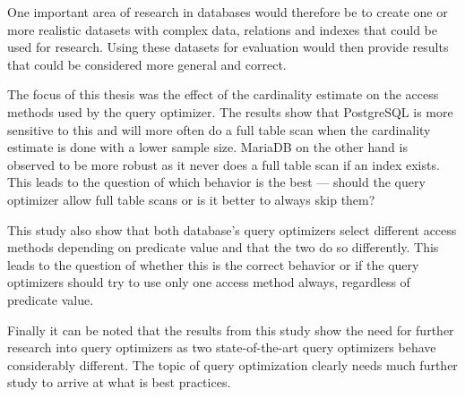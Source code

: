 One important area of research in databases would therefore be to create one or
more realistic datasets with complex data, relations and indexes that could be
used for research. Using these datasets for evaluation would then provide
results that could be considered more general and correct.

The focus of this thesis was the effect of the cardinality estimate on the
access methods used by the query optimizer. The results show that PostgreSQL is
more sensitive to this and will more often do a full table scan when the
cardinality estimate is done with a lower sample size. MariaDB on the other hand
is observed to be more robust as it never does a full table scan if an index
exists. This leads to the question of which behavior is the best --- should the
query optimizer allow full table scans or is it better to always skip them?

This study also show that both database's query optimizers select
different access methods depending on predicate value and that the two do so
differently. This leads to the question of whether this is the correct behavior
or if the query optimizers should try to use only one access method always,
regardless of predicate value.

Finally it can be noted that the results from this study show the need for
further research into query optimizers as two state-of-the-art query optimizers
behave considerably different. The topic of query optimization clearly needs
much further study to arrive at what is best practices.

